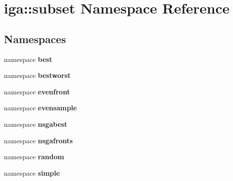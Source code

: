 \section{iga::subset Namespace Reference}
\label{namespaceiga_1_1subset}


\subsection*{Namespaces}
\begin{CompactItemize}
\item 
namespace {\bf best}
\item 
namespace {\bf bestworst}
\item 
namespace {\bf evenfront}
\item 
namespace {\bf evensample}
\item 
namespace {\bf nsgabest}
\item 
namespace {\bf nsgafronts}
\item 
namespace {\bf random}
\item 
namespace {\bf simple}
\end{CompactItemize}
